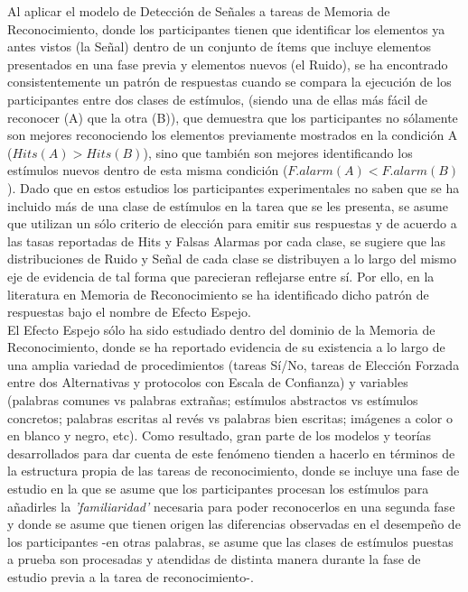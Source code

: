 \documentclass[jou,apacite]{apa6}
\begin{document}
Al aplicar el modelo de Detección de Señales a tareas de Memoria de Reconocimiento, donde los participantes tienen que identificar los elementos ya antes vistos (la Señal) dentro de un conjunto de ítems que incluye elementos presentados en una fase previa y elementos nuevos (el Ruido), se ha encontrado consistentemente un patrón de respuestas cuando se compara la ejecución de los participantes entre dos clases de estímulos, (siendo una de ellas más fácil de reconocer (A) que la otra (B)), que demuestra que los participantes no sólamente son mejores reconociendo los elementos previamente mostrados en la condición A ($Hits(A)>Hits(B)$), sino que también son mejores identificando los estímulos nuevos dentro de esta misma condición ($F.alarm(A)<F.alarm(B)$). Dado que en estos estudios los participantes experimentales no saben que se ha incluido más de una clase de estímulos en la tarea que se les presenta, se asume que utilizan un sólo criterio de elección para emitir sus respuestas y de acuerdo a las tasas reportadas de Hits y Falsas Alarmas por cada clase, se sugiere que las distribuciones de Ruido y Señal de cada clase se distribuyen a lo largo del mismo eje de evidencia de tal forma que parecieran reflejarse entre sí. Por ello, en la literatura en Memoria de Reconocimiento se ha identificado dicho patrón de respuestas bajo el nombre de Efecto Espejo.\\

El Efecto Espejo sólo ha sido estudiado dentro del dominio de la Memoria de Reconocimiento, donde se ha reportado evidencia de su existencia a lo largo de una amplia variedad de procedimientos (tareas Sí/No, tareas de Elección Forzada entre dos Alternativas y protocolos con Escala de Confianza) y variables (palabras comunes vs palabras extrañas; estímulos abstractos vs estímulos concretos; palabras escritas al revés vs palabras bien escritas; imágenes a color o en blanco y negro, etc). Como resultado, gran parte de los modelos y teorías desarrollados para dar cuenta de este fenómeno tienden a hacerlo en términos de la estructura propia de las tareas de reconocimiento, donde se incluye una fase de estudio en la que se asume que los participantes procesan los estímulos para añadirles la \textit{'familiaridad'} necesaria para poder reconocerlos en una segunda fase y donde se asume que tienen origen las diferencias observadas en el desempeño de los participantes -en otras palabras, se asume que las clases de estímulos puestas a prueba son procesadas y atendidas de distinta manera durante la fase de estudio previa a la tarea de reconocimiento-.\\
\end{document}
